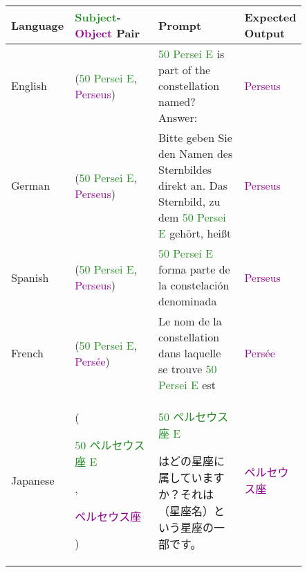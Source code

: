 \begin{table*}[htbp]
\scriptsize
\centering
\setlength{\tabcolsep}{1.0mm}{}
\begin{center}
\begin{tabular}{m{0.10\linewidth} p{0.30\linewidth} p{0.30\linewidth} m{0.15\linewidth}}
\textbf{Language} & \textbf{\textcolor{forestgreen}{Subject}-\textcolor{darkmagenta}{Object} Pair} & \textbf{Prompt} & \textbf{Expected Output} \\
\toprule
{\centering English} 
    & {\raggedright (\textcolor{forestgreen}{50 Persei E}, \textcolor{darkmagenta}{Perseus})}
    & \textcolor{forestgreen}{50 Persei E} is part of the constellation named? \newline Answer:
    & {\centering \textcolor{darkmagenta}{Perseus}} \\
\midrule
{\centering German} 
    & {\raggedright (\textcolor{forestgreen}{50 Persei E}, \textcolor{darkmagenta}{Perseus})}
    & Bitte geben Sie den Namen des Sternbildes direkt an. Das Sternbild, zu dem \textcolor{forestgreen}{50 Persei E} gehört, heißt
    & {\centering \textcolor{darkmagenta}{Perseus}} \\
\midrule
{\centering Spanish} 
    & {\raggedright (\textcolor{forestgreen}{50 Persei E}, \textcolor{darkmagenta}{Perseus})}
    & \textcolor{forestgreen}{50 Persei E} forma parte de la constelación denominada
    & {\centering \textcolor{darkmagenta}{Perseus}} \\
\midrule
{\centering French} 
    & {\raggedright (\textcolor{forestgreen}{50 Persei E}, \textcolor{darkmagenta}{Persée})}
    & Le nom de la constellation dans laquelle se trouve \textcolor{forestgreen}{50 Persei E} est
    & {\centering \textcolor{darkmagenta}{Persée}} \\
\midrule
{\centering Japanese} 
    & {\raggedright (\textcolor{forestgreen}{\begin{CJK}{UTF8}{min}50 ペルセウス座 E\end{CJK}}, \textcolor{darkmagenta}{\begin{CJK}{UTF8}{min}ペルセウス座\end{CJK}})}
    & \textcolor{forestgreen}{\begin{CJK}{UTF8}{min}50 ペルセウス座 E\end{CJK}}\begin{CJK}{UTF8}{min}はどの星座に属していますか？それは（星座名）という星座の一部です。\end{CJK}
    & {\centering \textcolor{darkmagenta}{\begin{CJK}{UTF8}{min}ペルセウス座\end{CJK}}} \\

\end{tabular}
\end{center}
\end{table*}
